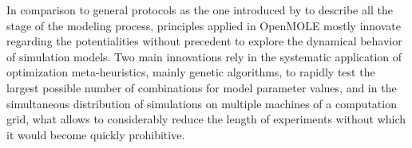 \documentclass[10pt]{article}
\begin{document}
In comparison to general protocols as the one introduced by \cite{grimm2005pattern} to describe all the stage of the modeling process, principles applied in OpenMOLE mostly innovate regarding the potentialities without precedent to explore the dynamical behavior of simulation models. Two main innovations rely in the systematic application of optimization meta-heuristics, mainly genetic algorithms, to rapidly test the largest possible number of combinations for model parameter values, and in the simultaneous distribution of simulations on multiple machines of a computation grid, what allows to considerably reduce the length of experiments without which it would become quickly prohibitive.
\end{document}
